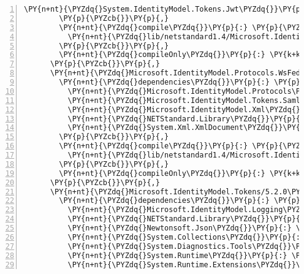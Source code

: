 \begin{Verbatim}[commandchars=\\\{\},numbers=left,firstnumber=1,stepnumber=1,numberblanklines=0]
          \PY{n+nt}{\PYZdq{}System.IdentityModel.Tokens.Jwt\PYZdq{}}\PY{p}{:} \PY{l+s+s2}{\PYZdq{}5.2.0\PYZdq{}}
        \PY{p}{\PYZcb{}}\PY{p}{,}
        \PY{n+nt}{\PYZdq{}compile\PYZdq{}}\PY{p}{:} \PY{p}{\PYZob{}}
          \PY{n+nt}{\PYZdq{}lib/netstandard1.4/Microsoft.IdentityModel.Protocols.OpenIdConnect.dll\PYZdq{}}\PY{p}{:} \PY{p}{\PYZob{}}\PY{p}{\PYZcb{}}
        \PY{p}{\PYZcb{}}\PY{p}{,}
        \PY{n+nt}{\PYZdq{}compileOnly\PYZdq{}}\PY{p}{:} \PY{k+kc}{true}
      \PY{p}{\PYZcb{}}\PY{p}{,}
      \PY{n+nt}{\PYZdq{}Microsoft.IdentityModel.Protocols.WsFederation/5.2.0\PYZdq{}}\PY{p}{:} \PY{p}{\PYZob{}}
        \PY{n+nt}{\PYZdq{}dependencies\PYZdq{}}\PY{p}{:} \PY{p}{\PYZob{}}
          \PY{n+nt}{\PYZdq{}Microsoft.IdentityModel.Protocols\PYZdq{}}\PY{p}{:} \PY{l+s+s2}{\PYZdq{}5.2.0\PYZdq{}}\PY{p}{,}
          \PY{n+nt}{\PYZdq{}Microsoft.IdentityModel.Tokens.Saml\PYZdq{}}\PY{p}{:} \PY{l+s+s2}{\PYZdq{}5.2.0\PYZdq{}}\PY{p}{,}
          \PY{n+nt}{\PYZdq{}Microsoft.IdentityModel.Xml\PYZdq{}}\PY{p}{:} \PY{l+s+s2}{\PYZdq{}5.2.0\PYZdq{}}\PY{p}{,}
          \PY{n+nt}{\PYZdq{}NETStandard.Library\PYZdq{}}\PY{p}{:} \PY{l+s+s2}{\PYZdq{}2.0.3\PYZdq{}}\PY{p}{,}
          \PY{n+nt}{\PYZdq{}System.Xml.XmlDocument\PYZdq{}}\PY{p}{:} \PY{l+s+s2}{\PYZdq{}4.3.0\PYZdq{}}
        \PY{p}{\PYZcb{}}\PY{p}{,}
        \PY{n+nt}{\PYZdq{}compile\PYZdq{}}\PY{p}{:} \PY{p}{\PYZob{}}
          \PY{n+nt}{\PYZdq{}lib/netstandard1.4/Microsoft.IdentityModel.Protocols.WsFederation.dll\PYZdq{}}\PY{p}{:} \PY{p}{\PYZob{}}\PY{p}{\PYZcb{}}
        \PY{p}{\PYZcb{}}\PY{p}{,}
        \PY{n+nt}{\PYZdq{}compileOnly\PYZdq{}}\PY{p}{:} \PY{k+kc}{true}
      \PY{p}{\PYZcb{}}\PY{p}{,}
      \PY{n+nt}{\PYZdq{}Microsoft.IdentityModel.Tokens/5.2.0\PYZdq{}}\PY{p}{:} \PY{p}{\PYZob{}}
        \PY{n+nt}{\PYZdq{}dependencies\PYZdq{}}\PY{p}{:} \PY{p}{\PYZob{}}
          \PY{n+nt}{\PYZdq{}Microsoft.IdentityModel.Logging\PYZdq{}}\PY{p}{:} \PY{l+s+s2}{\PYZdq{}5.2.0\PYZdq{}}\PY{p}{,}
          \PY{n+nt}{\PYZdq{}NETStandard.Library\PYZdq{}}\PY{p}{:} \PY{l+s+s2}{\PYZdq{}2.0.3\PYZdq{}}\PY{p}{,}
          \PY{n+nt}{\PYZdq{}Newtonsoft.Json\PYZdq{}}\PY{p}{:} \PY{l+s+s2}{\PYZdq{}11.0.2\PYZdq{}}\PY{p}{,}
          \PY{n+nt}{\PYZdq{}System.Collections\PYZdq{}}\PY{p}{:} \PY{l+s+s2}{\PYZdq{}4.3.0\PYZdq{}}\PY{p}{,}
          \PY{n+nt}{\PYZdq{}System.Diagnostics.Tools\PYZdq{}}\PY{p}{:} \PY{l+s+s2}{\PYZdq{}4.3.0\PYZdq{}}\PY{p}{,}
          \PY{n+nt}{\PYZdq{}System.Runtime\PYZdq{}}\PY{p}{:} \PY{l+s+s2}{\PYZdq{}4.3.0\PYZdq{}}\PY{p}{,}
          \PY{n+nt}{\PYZdq{}System.Runtime.Extensions\PYZdq{}}\PY{p}{:} \PY{l+s+s2}{\PYZdq{}4.3.0\PYZdq{}}\PY{p}{,}

\end{Verbatim}
